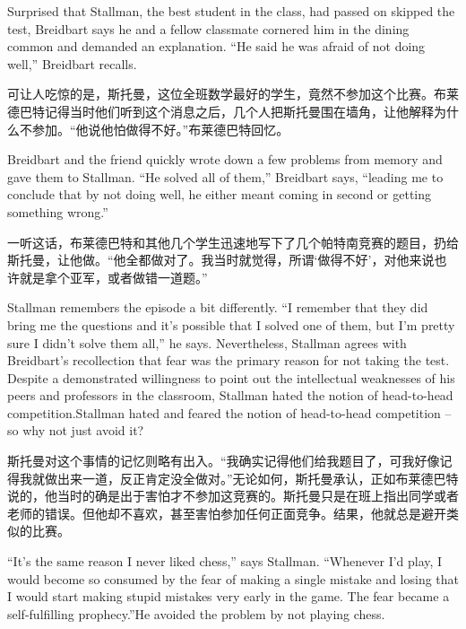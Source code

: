 \ifdefined\eng
Surprised that Stallman, the best student in the class, had \ifdefined\vone passed on \fi\ifdefined\vtwo skipped \fi the test, Breidbart says he and a fellow classmate cornered him in the dining common and demanded an explanation. ``He said he was afraid of not doing well,'' Breidbart recalls.
\fi

\ifdefined\chs
可让人吃惊的是，斯托曼，这位全班数学最好的学生，竟然不参加这个比赛。布莱德巴特记得当时他们听到这个消息之后，几个人把斯托曼围在墙角，让他解释为什么不参加。``他说他怕做得不好。''布莱德巴特回忆。
\fi

\ifdefined\eng
Breidbart and the friend quickly wrote down a few problems from memory and gave them to Stallman. ``He solved all of them,'' Breidbart says, ``leading me to conclude that by not doing well, he either meant coming in second or getting something wrong.''
\fi

\ifdefined\chs
一听这话，布莱德巴特和其他几个学生迅速地写下了几个帕特南竞赛的题目，扔给斯托曼，让他做。``他全都做对了。我当时就觉得，所谓`做得不好'，对他来说也许就是拿个亚军，或者做错一道题。''
\fi

\ifdefined\eng
Stallman remembers the episode a bit differently. ``I remember that they did bring me the questions and it's possible that I solved one of them, but I'm pretty sure I didn't solve them all,'' he says. Nevertheless, Stallman agrees with Breidbart's recollection that fear was the primary reason for not taking the test. Despite a demonstrated willingness to point out the intellectual weaknesses of his peers and professors in the classroom, \ifdefined\vone Stallman hated the notion of head-to-head competition.\fi\ifdefined\vtwo Stallman hated and feared the notion of head-to-head competition -- so why not just avoid it?\fi
\fi

\ifdefined\chs
斯托曼对这个事情的记忆则略有出入。``我确实记得他们给我题目了，可我好像记得我就做出来一道，反正肯定没全做对。''无论如何，斯托曼承认，正如布莱德巴特说的，他当时的确是出于害怕才不参加这竞赛的。斯托曼只是在班上指出同学或者老师的错误。但他却不喜欢，甚至害怕参加任何正面竞争。结果，他就总是避开类似的比赛。
\fi

\ifdefined\eng
``It's the same reason I never liked chess,'' says Stallman. ``Whenever I'd play, I would become so consumed by the fear of making a single mistake \ifdefined\vtwo and losing \fi that I would start making stupid mistakes very early in the game. The fear became a self-fulfilling prophecy.''\ifdefined\vtwo  He avoided the problem by not playing chess.\fi
\fi

